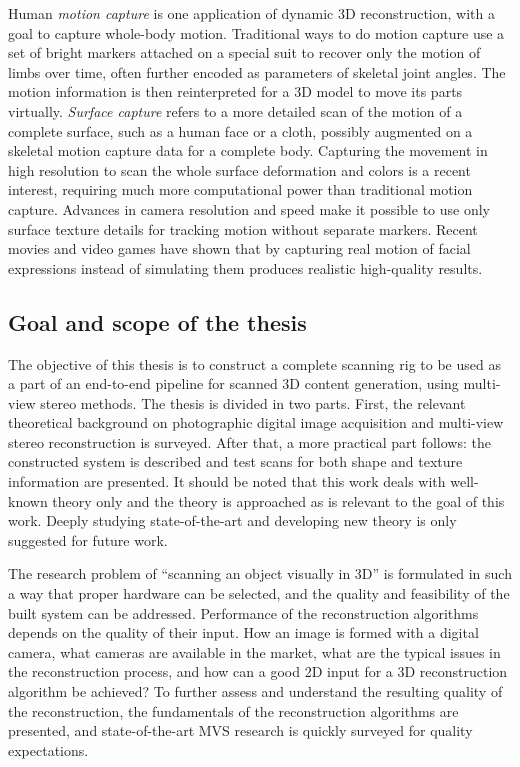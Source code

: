 
Human \emph{motion capture} is one application of dynamic 3D reconstruction, with a goal to capture whole-body motion.
Traditional ways to do motion capture use a set of bright markers attached on a special suit to recover only the motion of limbs over time, often further encoded as parameters of skeletal joint angles.
The motion information is then reinterpreted for a 3D model to move its parts virtually.
\emph{Surface capture} refers to a more detailed scan of the motion of a complete surface, such as a human face or a cloth, possibly augmented on a skeletal motion capture data for a complete body.
Capturing the movement in high resolution to scan the whole surface deformation and colors is a recent interest, requiring much more computational power than traditional motion capture.
Advances in camera resolution and speed make it possible to use only surface texture details for tracking motion without separate markers.
Recent movies and video games have shown that by capturing real motion of facial expressions instead of simulating them produces realistic high-quality results.

\subsection{Goal and scope of the thesis}


The objective of this thesis is to construct a complete scanning rig to be used as a part of an end-to-end pipeline for scanned 3D content generation, using multi-view stereo methods.
The thesis is divided in two parts.
First, the relevant theoretical background on photographic digital image acquisition and multi-view stereo reconstruction is surveyed.
After that, a more practical part follows: the constructed system is described and test scans for both shape and texture information are presented.
It should be noted that this work deals with well-known theory only and the theory is approached as is relevant to the goal of this work.
Deeply studying state-of-the-art and developing new theory is only suggested for future work.


The research problem of ``scanning an object visually in 3D'' is formulated in such a way that proper hardware can be selected, and the quality and feasibility of the built system can be addressed.
Performance of the reconstruction algorithms depends on the quality of their input.
How an image is formed with a digital camera, what cameras are available in the market, what are the typical issues in the reconstruction process, and how can a good 2D input for a 3D reconstruction algorithm be achieved?
To further assess and understand the resulting quality of the reconstruction, the fundamentals of the reconstruction algorithms are presented, and state-of-the-art MVS research is quickly surveyed for quality expectations.

